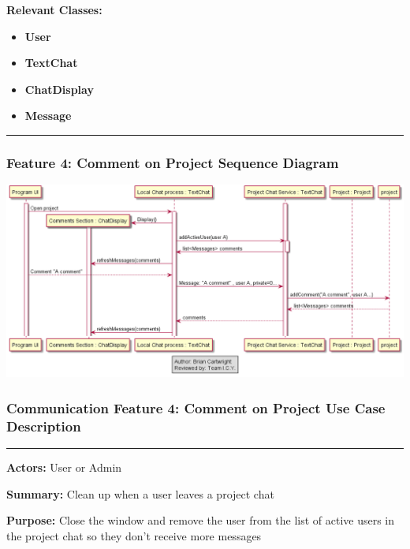 \documentclass[twoside,letterpaper]{article}
\begin{document}
\noindent\textbf{Relevant Classes:}
\begin{itemize}
	\item \textbf{User}
	\item \textbf{TextChat}
	\item \textbf{ChatDisplay}
	\item \textbf{Message}
\end{itemize}
\hrule
\newpage

\subsubsection[Communication Feature 4: Comment on Project Sequence Diagram]{\rmfamily\bfseries\color{black}
	Feature 4: Comment on Project Sequence Diagram}
\hypertarget{RefHeading22059017292}{}

\bigskip

\includegraphics[width=\textwidth]{images/SequenceDiagrams/Comms_LeaveComment}

\newpage

\subsubsection[Communication Feature 5: Close chat Use Case Description]{\rmfamily\bfseries\color{black}
	Communication Feature 4: Comment on Project Use Case Description}
\hypertarget{RefHeading22059017292}{}

\vspace{2pt}
\hrule
\vspace{8pt}
\textbf{Actors:} User or Admin \newline

\noindent\textbf{Summary:} Clean up when a user leaves a project chat \newline

\noindent\textbf{Purpose:} Close the window and remove the user from the list of active users in the project chat so they don't receive more messages \newline
\end{document}
